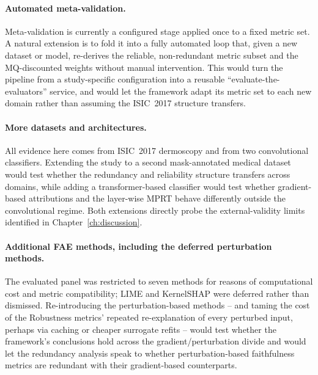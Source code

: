 \paragraph{Automated meta-validation.}
Meta-validation is currently a configured stage applied once to a fixed metric
set. A natural extension is to fold it into a fully automated loop that, given a
new dataset or model, re-derives the reliable, non-redundant metric subset and
the MQ-discounted weights without manual intervention. This would turn the
pipeline from a study-specific configuration into a reusable
``evaluate-the-evaluators'' service, and would let the framework adapt its
metric set to each new domain rather than assuming the ISIC~2017 structure
transfers.

\paragraph{More datasets and architectures.}
All evidence here comes from ISIC~2017 dermoscopy and from two convolutional
classifiers. Extending the study to a second mask-annotated medical dataset
would test whether the redundancy and reliability structure transfers across
domains, while adding a transformer-based classifier would test whether
gradient-based attributions and the layer-wise MPRT behave differently outside
the convolutional regime. Both extensions directly probe the external-validity
limits identified in Chapter~\ref{ch:discussion}.

\paragraph{Additional FAE methods, including the deferred perturbation
methods.}
The evaluated panel was restricted to seven methods for reasons of
computational cost and metric compatibility; LIME and KernelSHAP were deferred
rather than dismissed. Re-introducing the perturbation-based methods -- and
taming the cost of the Robustness metrics' repeated re-explanation of every
perturbed input, perhaps via caching or cheaper surrogate refits -- would test
whether the framework's conclusions hold across the gradient/perturbation
divide and would let the redundancy analysis speak to whether perturbation-based
faithfulness metrics are redundant with their gradient-based counterparts.

